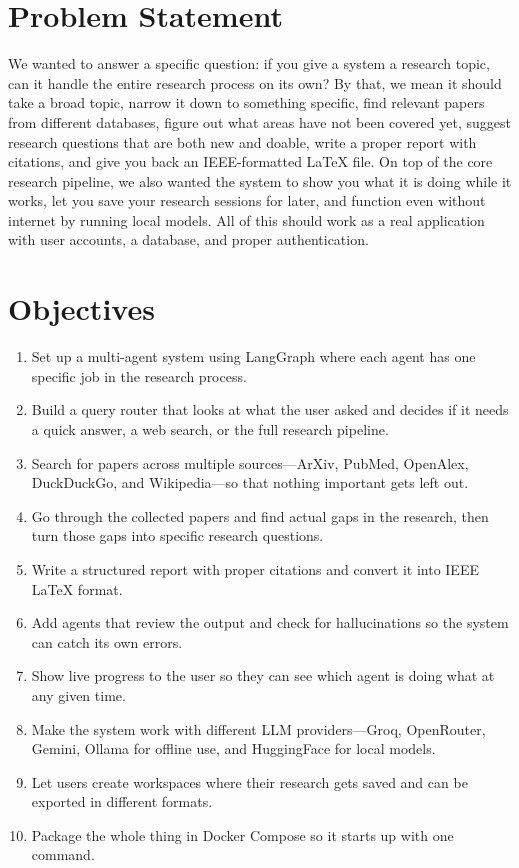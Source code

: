 \documentclass[12pt,a4paper]{article}
\begin{document}
\section{Problem Statement}

We wanted to answer a specific question: if you give a system a research topic, can it handle the entire research process on its own? By that, we mean it should take a broad topic, narrow it down to something specific, find relevant papers from different databases, figure out what areas have not been covered yet, suggest research questions that are both new and doable, write a proper report with citations, and give you back an IEEE-formatted LaTeX file. On top of the core research pipeline, we also wanted the system to show you what it is doing while it works, let you save your research sessions for later, and function even without internet by running local models. All of this should work as a real application with user accounts, a database, and proper authentication.

\section{Objectives}

\begin{enumerate}[label=\textbf{\arabic*.}, leftmargin=*, itemsep=1pt, topsep=2pt]
  \item Set up a multi-agent system using LangGraph where each agent has one specific job in the research process.
  \item Build a query router that looks at what the user asked and decides if it needs a quick answer, a web search, or the full research pipeline.
  \item Search for papers across multiple sources---ArXiv, PubMed, OpenAlex, DuckDuckGo, and Wikipedia---so that nothing important gets left out.
  \item Go through the collected papers and find actual gaps in the research, then turn those gaps into specific research questions.
  \item Write a structured report with proper citations and convert it into IEEE LaTeX format.
  \item Add agents that review the output and check for hallucinations so the system can catch its own errors.
  \item Show live progress to the user so they can see which agent is doing what at any given time.
  \item Make the system work with different LLM providers---Groq, OpenRouter, Gemini, Ollama for offline use, and HuggingFace for local models.
  \item Let users create workspaces where their research gets saved and can be exported in different formats.
  \item Package the whole thing in Docker Compose so it starts up with one command.
\end{enumerate}
\end{document}
